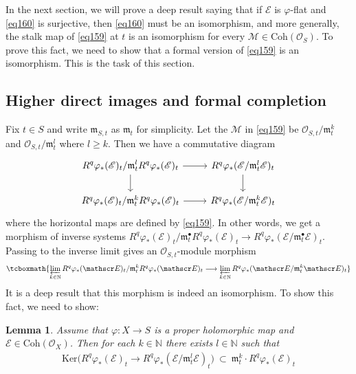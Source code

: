 \documentclass[12pt,b5paper,notitlepage]{report}
\theoremstyle{definition}
\theoremstyle{plain}
\newtheorem{lm}[df]{Lemma}
\newcommand{\scr}{\mathscr}
\newcommand{\blt}{\bullet}
\newcommand{\Nbb}{\mathbb N}
\newcommand{\Ker}{\mathrm{Ker}}
\newcommand{\mk}{\mathfrak m}
\newcommand{\Coh}{\mathrm{Coh}}
\numberwithin{equation}{section}
\begin{document}
In the next section, we will prove a deep result saying that if $\scr E$ is $\varphi$-flat and \eqref{eq160} is surjective, then \eqref{eq160} must be an isomorphism, and more generally, the stalk map of \eqref{eq159} at $t$ is an isomorphism for every $\scr M\in\Coh(\scr O_S)$.  To prove this fact, we need to show that a formal version of \eqref{eq159} is an isomorphism. This is the task of this section.



\subsection{Higher direct images and formal completion}

Fix $t\in S$ and write $\mk_{S,t}$ as $\mk_t$ for simplicity. Let the $\scr M$ in \eqref{eq159} be $\scr O_{S,t}/\mk_t^k$ and $\scr O_{S,t}/\mk_t^l$ where $l\geq k$. Then we have a commutative diagram
\begin{equation*}
\begin{tikzcd}\displaystyle
R^q\varphi_*(\scr E)_t/\mk_t^l R^q\varphi_*(\scr E)_t \arrow[r] \arrow[d] & R^q\varphi_*(\scr E/\mk_t^l\scr E)_t \arrow[d] \\
R^q\varphi_*(\scr E)_t/\mk_t^k R^q\varphi_*(\scr E)_t \arrow[r]           & R^q\varphi_*(\scr E/\mk_t^k\scr E)_t         
\end{tikzcd}
\end{equation*}
where the horizontal maps are defined by \eqref{eq159}. In other words, we get a morphism of inverse systems $R^q\varphi_*(\scr E)_t/\mk_t^\blt R^q\varphi_*(\scr E)_t\rightarrow R^q\varphi_*(\scr E/\mk_t^\blt\scr E)_t$. Passing to the inverse limit gives an $\scr O_{S,t}$-module morphism
\begin{align}
\tcboxmath{\varprojlim_{k\in\Nbb}R^q\varphi_*(\scr E)_t/\mk_t^k R^q\varphi_*(\scr E)_t\longrightarrow\varprojlim_{k\in\Nbb}R^q\varphi_*(\scr E/\mk_t^k\scr E)_t  }  \label{eq161}
\end{align}
It is a deep result that this morphism is indeed an isomorphism. To show this fact, we need to show:

\begin{lm}\label{lb330}
Assume that $\varphi:X\rightarrow S$ is a proper holomorphic map and $\scr E\in\Coh(\scr O_X)$.  Then for each $k\in\Nbb$ there exists $l\in\Nbb$ such that 
\begin{align}
\Ker\big(R^q\varphi_*(\scr E)_t\rightarrow R^q\varphi_*(\scr E/\mk_t^l\scr E)_t \big)~\subset~\mk_t^k \cdot R^q\varphi_*(\scr E)_t  \label{eq162}
\end{align}
\end{lm}
\end{document}
